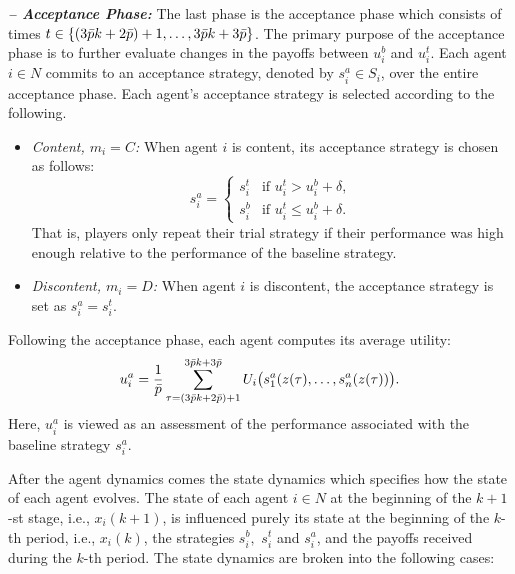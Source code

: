 %
\noindent \emph{\textbf{-- Acceptance Phase:}} The last phase is the acceptance phase which consists of times $t \in \{(3 \bar{p} k + 2\bar{p})+1, \dots, 3\bar{p} k + 3\bar{p}\}$.  The primary purpose of the acceptance phase is to further evaluate changes in the payoffs between $u_i^b$ and $u_i^t$.  Each agent $i \in N$ commits to an acceptance strategy, denoted by $s_i^a \in S_i$, over the entire acceptance phase.  Each agent's acceptance strategy is selected according to the following.
%

\begin{itemize}%
%
\item \emph{Content, $m_i = C$:}
When agent $i$ is content, its acceptance strategy is chosen as follows:
\begin{equation}
s_i^a = \left\{
\begin{array}{ll}
s_i^t &\text{if } u_i^t > u_i^b + \delta, \\
s_i^b &\text{if } u_i^t \leq u_i^b + \delta. 
\end{array}\right.
\end{equation}
%
That is, players only repeat their trial strategy if their performance was high enough relative to the performance of the baseline strategy.  

\item \emph{Discontent, $m_i = D$:}
When agent $i$ is discontent, the acceptance strategy is set as $s_i^a = s_i^t$.
\end{itemize}

Following the acceptance phase, each agent computes its average utility:
%
\begin{equation}\label{e:acceptance payoff}
u_i^a = {1\over \bar{p}}\sum_{\tau = (3 \bar{p} k + 2\bar{p})+1}^{3\bar{p} k + 3\bar{p}}U_i\bigl(s_1^a(z(\tau), \dots, s_n^a(z(\tau))  \bigr).
\end{equation}
%
Here, $u_i^a$ is viewed as an assessment of the performance associated with the baseline strategy $s_i^a$.  
%
%


\vspace{.2cm}

  After the agent dynamics comes the state dynamics which specifies how the state of each agent evolves.  The state of each agent $i \in N$ at the beginning of the $k+1$-st stage, i.e., $x_i(k+1)$, is influenced purely its state at the beginning of the $k$-th period, i.e., $x_i(k)$, the strategies $s_i^b,$ $s_i^t$ and $s_i^a$, and the payoffs received during the $k$-th period.   The state dynamics are broken into the following cases:
%  

